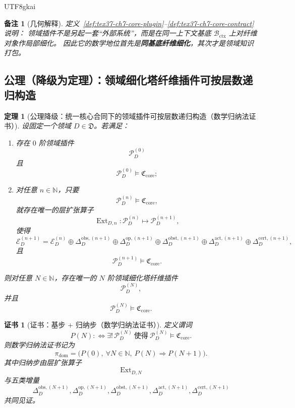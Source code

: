 \documentclass[12pt]{article}
\newtheorem{theorem}{定理}[section]
\newtheorem{remark}{备注}[section]
\newtheorem{Certificate}{证书}[section]
\newcommand{\NN}{\mathbb{N}}
\begin{document}
\begin{CJK*}{UTF8}{gkai}
\begin{remark}[几何解释]
定义~\ref{def:tex37-ch7-core-plugin}--\ref{def:tex37-ch7-core-contract} 说明：
领域插件不是另起一套“外部系统”，而是在同一上下文基底 $\mathcal B_{\mathrm{ctx}}$ 上对纤维对象作局部细化。
因此它的数学地位首先是\textbf{同基底纤维细化}，其次才是领域知识打包。
\end{remark}

\subsection{公理（降级为定理）：领域细化塔纤维插件可按层数递归构造}
\label{subsec:tex37-ch7-axiom}

\begin{theorem}[公理降级：统一核心合同下的领域插件可按层数递归构造（数学归纳法证书）]
\label{thm:tex37-ch7-induction}
设固定一个领域 $D\in\mathfrak D$。若满足：
\begin{enumerate}
  \item 存在 $0$ 阶领域插件
  \[
    \mathcal P_D^{(0)}
  \]
  且
  \[
    \mathcal P_D^{(0)}\models \mathfrak C_{\mathrm{core}};
  \]
  \item 对任意 $n\in\NN$，只要
  \[
    \mathcal P_D^{(n)}\models \mathfrak C_{\mathrm{core}},
  \]
  就存在唯一的层扩张算子
  \[
    \operatorname{Ext}_{D,n}:\mathcal P_D^{(n)}\mapsto \mathcal P_D^{(n+1)},
  \]
  使得
  \[
    \mathcal E_D^{(n+1)}
    =
    \mathcal E_D^{(n)}
    \oplus
    \Delta_D^{\mathrm{obs},(n+1)}
    \oplus
    \Delta_D^{\mathrm{op},(n+1)}
    \oplus
    \Delta_D^{\mathrm{obst},(n+1)}
    \oplus
    \Delta_D^{\mathrm{act},(n+1)}
    \oplus
    \Delta_D^{\mathrm{cert},(n+1)},
  \]
  且
  \[
    \mathcal P_D^{(n+1)}\models \mathfrak C_{\mathrm{core}}.
  \]
\end{enumerate}
则对任意 $N\in\NN$，存在唯一的 $N$ 阶领域细化塔纤维插件
\[
  \mathcal P_D^{(N)},
\]
并且
\[
  \mathcal P_D^{(N)}\models \mathfrak C_{\mathrm{core}}.
\]
\end{theorem}

\begin{Certificate}[证书：基步 + 归纳步（数学归纳法证书）]
\label{cert:tex37-ch7-induction}
定义谓词
\[
  P(N)
  :
  \Longleftrightarrow
  \exists!\,\mathcal P_D^{(N)}
  \ \text{使得}\
  \mathcal P_D^{(N)}\models \mathfrak C_{\mathrm{core}}.
\]
则数学归纳法证书记为
\[
  \pi_{\mathrm{dom}}
  =
  \bigl(
    P(0),\
    \forall N\in\NN,\ P(N)\Rightarrow P(N+1)
  \bigr).
\]
其中归纳步由层扩张算子
\[
  \operatorname{Ext}_{D,N}
\]
与五类增量
\[
  \Delta_D^{\mathrm{obs},(N+1)},
  \Delta_D^{\mathrm{op},(N+1)},
  \Delta_D^{\mathrm{obst},(N+1)},
  \Delta_D^{\mathrm{act},(N+1)},
  \Delta_D^{\mathrm{cert},(N+1)}
\]
共同见证。
\end{Certificate}


\end{CJK*}
\end{document}
